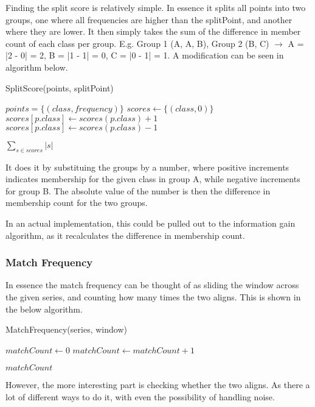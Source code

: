\documentclass[../../main.tex]{subfiles}
\begin{document}
Finding the split score is relatively simple. In essence it splits all points into two groups, one where all frequencies are higher than the splitPoint, and another where they are lower. It then simply takes the sum of the difference in member count of each class per group. E.g. Group 1 (A, A, B), Group 2 (B, C) $\rightarrow$ A = |2 - 0| = 2, B = |1 - 1| = 0, C = |0 - 1| = 1. A modification can be seen in algorithm below.

\begin{algorithm}
\caption{SplitScore(points, splitPoint)}
\begin{algorithmic}
\Require $points = \{(class, frequency)\}$
\State $scores \gets \{(class, 0)\}$
			\State $scores[p.class] \gets scores(p.class) + 1$
		\Else{}
			\State $scores[p.class] \gets scores(p.class) - 1$
		\EndIf
\EndFor

\Return $\sum_{s \in scores} |s|$ 
\end{algorithmic}
\end{algorithm}

It does it by substituing the groups by a number, where positive increments indicates membership for the given class in group A, while negative increments for group B. The absolute value of the number is then the difference in membership count for the two groups.

In an actual implementation, this could be pulled out to the information gain algorithm, as it recalculates the difference in membership count.

\subsubsection{Match Frequency}
In essence the match frequency can be thought of as sliding the window across the given series, and counting how many times the two aligns. This is shown in the below algorithm.
\begin{algorithm}
\caption{MatchFrequency(series, window)}
\begin{algorithmic}
\State $matchCount \gets 0$
		\State $matchCount \gets matchCount + 1$
	\EndIf
\EndFor

\Return $matchCount$
\end{algorithmic}
\end{algorithm}

However, the more interesting part is checking whether the two aligns. As there a lot of different ways to do it, with even the possibility of handling noise.
\end{document}
